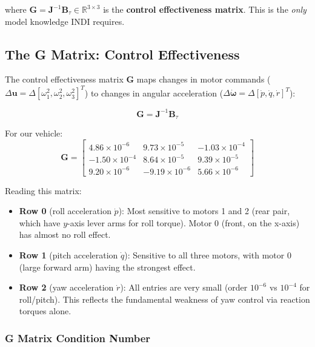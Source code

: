 \documentclass[12pt, a4paper]{article}
\newcommand{\R}{\mathbb{R}}
\newcommand{\bu}{\bm{u}}
\newcommand{\bomega}{\bm{\omega}}
\newcommand{\bJ}{\bm{J}}
\newcommand{\bB}{\bm{B}}
\begin{document}
where $\bm{G} = \bJ^{-1} \bB_\tau \in \R^{3 \times 3}$ is the \textbf{control effectiveness matrix}.  This is the \emph{only} model knowledge INDI requires.

\subsection{The G Matrix: Control Effectiveness}

The control effectiveness matrix $\bm{G}$ maps changes in motor commands ($\Delta\bu = \Delta[\omega_1^2, \omega_2^2, \omega_3^2]^T$) to changes in angular acceleration ($\Delta\dot{\bomega} = \Delta[\dot{p}, \dot{q}, \dot{r}]^T$):

\begin{equation}
    \bm{G} = \bJ^{-1} \bB_\tau
\end{equation}

For our vehicle:
\begin{equation}
    \bm{G} = \begin{bmatrix}
        4.86 \times 10^{-6} & 9.73 \times 10^{-5} & -1.03 \times 10^{-4} \\
        -1.50 \times 10^{-4} & 8.64 \times 10^{-5} & 9.39 \times 10^{-5} \\
        9.20 \times 10^{-6} & -9.19 \times 10^{-6} & 5.66 \times 10^{-6}
    \end{bmatrix}
\end{equation}

Reading this matrix:
\begin{itemize}
    \item \textbf{Row 0} (roll acceleration $\dot{p}$): Most sensitive to motors 1 and 2 (rear pair, which have $y$-axis lever arms for roll torque).  Motor 0 (front, on the x-axis) has almost no roll effect.
    \item \textbf{Row 1} (pitch acceleration $\dot{q}$): Sensitive to all three motors, with motor 0 (large forward arm) having the strongest effect.
    \item \textbf{Row 2} (yaw acceleration $\dot{r}$): All entries are very small (order $10^{-6}$ vs $10^{-4}$ for roll/pitch).  This reflects the fundamental weakness of yaw control via reaction torques alone.
\end{itemize}

\subsubsection{G Matrix Condition Number}
\end{document}
